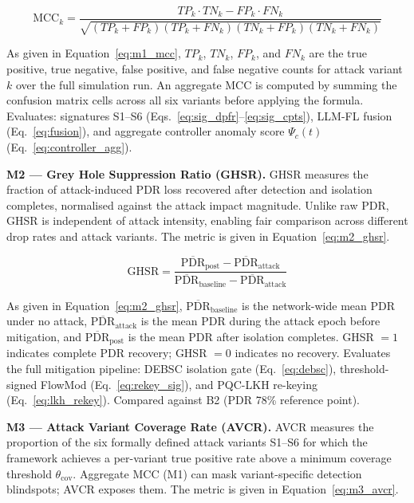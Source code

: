 \documentclass[12pt, a4paper]{report}
\newcommand{\mypar}{\vspace{0.8em}\noindent}
\begin{document}
\begin{equation}
\label{eq:m1_mcc}
\text{MCC}_k =
\frac{TP_k \cdot TN_k - FP_k \cdot FN_k}
{\sqrt{(TP_k + FP_k)(TP_k + FN_k)(TN_k + FP_k)(TN_k + FN_k)}}
\end{equation}

As given in Equation~\eqref{eq:m1_mcc}, $TP_k$, $TN_k$, $FP_k$, and
$FN_k$ are the true positive, true negative, false positive, and false
negative counts for attack variant $k$ over the full simulation run.
An aggregate MCC is computed by summing the confusion matrix cells across
all six variants before applying the formula. Evaluates: signatures S1--S6
(Eqs.~\eqref{eq:sig_dpfr}--\eqref{eq:sig_cpts}), LLM-FL fusion
(Eq.~\eqref{eq:fusion}), and aggregate controller anomaly score $\Psi_c(t)$
(Eq.~\eqref{eq:controller_agg}).

\mypar
\textbf{M2 --- Grey Hole Suppression Ratio (GHSR).}
GHSR measures the fraction of attack-induced PDR loss recovered after
detection and isolation completes, normalised against the attack impact
magnitude. Unlike raw PDR, GHSR is independent of attack intensity,
enabling fair comparison across different drop rates and attack variants.
The metric is given in Equation~\eqref{eq:m2_ghsr}.

\begin{equation}
\label{eq:m2_ghsr}
\text{GHSR} =
\frac{\overline{\text{PDR}}_{\text{post}} -
      \overline{\text{PDR}}_{\text{attack}}}
     {\overline{\text{PDR}}_{\text{baseline}} -
      \overline{\text{PDR}}_{\text{attack}}}
\end{equation}

As given in Equation~\eqref{eq:m2_ghsr},
$\overline{\text{PDR}}_{\text{baseline}}$ is the network-wide mean PDR
under no attack, $\overline{\text{PDR}}_{\text{attack}}$ is the mean PDR
during the attack epoch before mitigation, and
$\overline{\text{PDR}}_{\text{post}}$ is the mean PDR after isolation
completes. GHSR $= 1$ indicates complete PDR recovery; GHSR $= 0$ indicates
no recovery. Evaluates the full mitigation pipeline: DEBSC isolation gate
(Eq.~\eqref{eq:debsc}), threshold-signed FlowMod (Eq.~\eqref{eq:rekey_sig}),
and PQC-LKH re-keying (Eq.~\eqref{eq:lkh_rekey}). Compared against B2
(PDR 78\% reference point).

\mypar
\textbf{M3 --- Attack Variant Coverage Rate (AVCR).}
AVCR measures the proportion of the six formally defined attack variants
S1--S6 for which the framework achieves a per-variant true positive rate
above a minimum coverage threshold $\theta_{\text{cov}}$. Aggregate MCC
(M1) can mask variant-specific detection blindspots; AVCR exposes them.
The metric is given in Equation~\eqref{eq:m3_avcr}.
\end{document}
